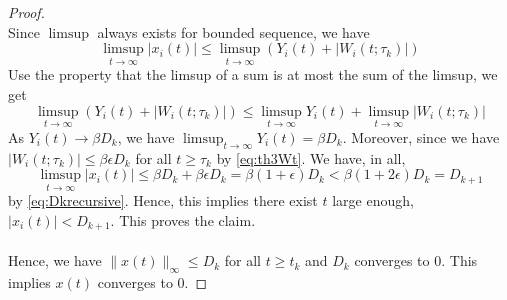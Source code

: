 \begin{proof}
    \\
    Since $\limsup$ always exists for bounded sequence, we have
    \begin{equation}
        \limsup_{t\to\infty} |x_i(t)| \le \limsup_{t\to\infty} (Y_i(t) + |W_i(t;\tau_k)|)
    \end{equation}
    Use the property that the limsup of a sum is at most the sum of the limsup, we get
    $$
    \limsup_{t\to\infty} (Y_i(t) + |W_i(t;\tau_k)|)\le \limsup_{t\to\infty} Y_i(t) + \limsup_{t\to\infty} |W_i(t;\tau_k)|
    $$
    As $Y_i(t)\to \beta D_k$, we have $\limsup_{t\to \infty} Y_i(t) = \beta D_k$. Moreover, since we have $|W_i(t;\tau_k)|\le \beta\epsilon D_k$ for all $t\ge \tau_k$ by \autoref{eq:th3Wt}. We have, in all,
    $$
    \limsup_{t\to\infty} |x_i(t)| \le \beta D_k  + \beta \epsilon D_k = \beta(1+\epsilon) D_k<\beta(1+2\epsilon) D_k =D_{k+1}
    $$
    by \autoref{eq:Dkrecursive}. Hence, this implies there exist $t$ large enough, $|x_i(t)|<D_{k+1}$. This proves the claim.\\
    \\
    Hence, we have $\|x(t)\|_\infty\le D_k$ for all $t\ge t_k$ and $D_k$ converges to $0$. This implies $x(t)$ converges to $0$.
\end{proof}
